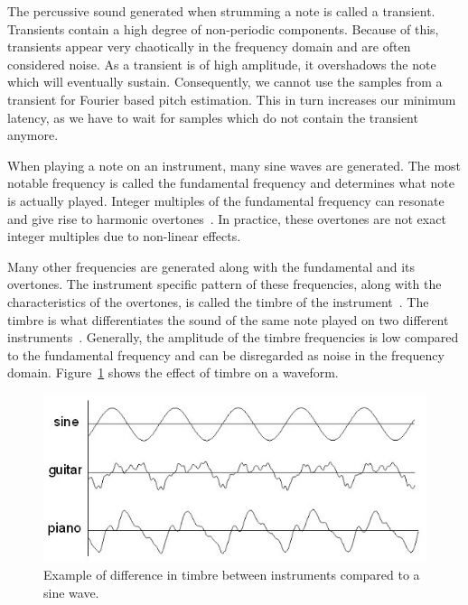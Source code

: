 \documentclass[10pt,twocolumn]{article}
\begin{document}
The percussive sound generated when strumming a note is called a transient. Transients contain a high degree of non-periodic components. Because of this, transients appear very chaotically in the frequency domain and are often considered noise. As a transient is of high amplitude, it overshadows the note which will eventually sustain. Consequently, we cannot use the samples from a transient for Fourier based pitch estimation. This in turn increases our minimum latency, as we have to wait for samples which do not contain the transient anymore.

When playing a note on an instrument, many sine waves are generated. The most notable frequency is called the fundamental frequency and determines what note is actually played. Integer multiples of the fundamental frequency can resonate and give rise to harmonic overtones~\cite{overtones}. In practice, these overtones are not exact integer multiples due to non-linear effects.

Many other frequencies are generated along with the fundamental and its overtones. The instrument specific pattern of these frequencies, along with the characteristics of the overtones, is called the timbre of the instrument~\cite{timbre}. The timbre is what differentiates the sound of the same note played on two different instruments~\cite{perception}. Generally, the amplitude of the timbre frequencies is low compared to the fundamental frequency and can be disregarded as noise in the frequency domain. Figure~\ref{fig:timbre} shows the effect of timbre on a waveform.
\begin{figure}[h]
    \centering
    \includegraphics[width=\linewidth]{fig/timbre.jpg}
    \caption{Example of difference in timbre between instruments compared to a sine wave.}
    \label{fig:timbre}
\end{figure}
\end{document}
